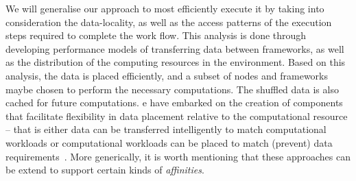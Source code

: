 \documentclass[3p,twocolumn]{elsarticle}
\begin{document}
We will generalise our approach to most efficiently execute it by
taking into consideration the data-locality, as well as the access
patterns of the execution steps required to complete the work
flow. This analysis is done through developing performance models of
transferring data between frameworks, as well as the distribution of
the computing resources in the environment. Based on this analysis,
the data is placed efficiently, and a subset of nodes and frameworks
maybe chosen to perform the necessary computations. The shuffled data
is also cached for future computations.  e have embarked on the
creation of components that facilitate flexibility in data placement
relative to the computational resource -- that is either data can be
transferred intelligently to match computational workloads or
computational workloads can be placed to match (prevent) data
requirements~\cite{}. More generically, it is worth mentioning that
these approaches can be extend to support certain kinds of {\it
  affinities}.




\end{document}
